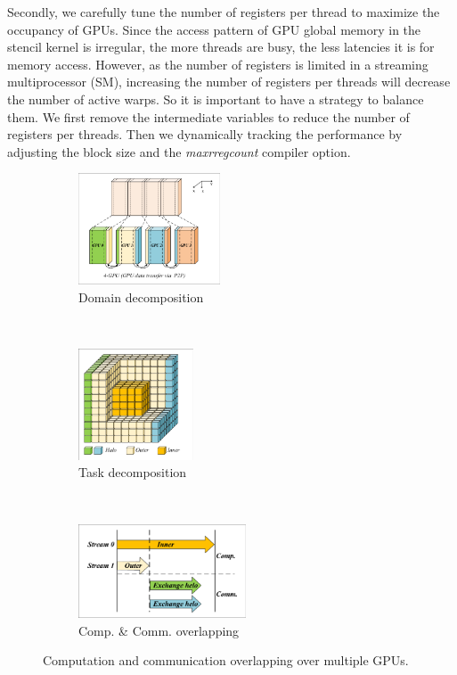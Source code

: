 \documentclass{paris17}
\begin{document}
Secondly, we carefully tune the number of registers per thread to maximize the occupancy of GPUs. Since the access pattern of GPU global memory in the stencil kernel is irregular, the more threads are busy, the less latencies it is for memory access. However, as the number of registers is limited in a streaming multiprocessor (SM), increasing the number of registers per threads will decrease the number of active warps. So it is important to have a strategy to balance them. We first remove the intermediate variables to reduce the number of registers per threads. Then we dynamically tracking the performance by adjusting the block size and the \emph{maxrregcount} compiler option.

\begin{figure}[h]
    \centering
    \begin{subfigure}[b]{0.3\textwidth}
        \centering
        \includegraphics[height=1.3in]{./fig/domain-decompose.pdf}
        \caption{Domain decomposition}
    \end{subfigure}%
    ~ 
    \begin{subfigure}[b]{0.3\textwidth}
        \centering
        \includegraphics[height=1.3in]{./fig/inner-outer.pdf}
        \caption{Task decomposition}
    \end{subfigure}
    ~ 
    \begin{subfigure}[b]{0.3\textwidth}
        \centering
        \includegraphics[height=1.1in]{./fig/overlap.pdf}
        \caption{Comp. \& Comm. overlapping}
    \end{subfigure}
    \caption{Computation and communication overlapping over multiple GPUs.}
\end{figure}
\end{document}
